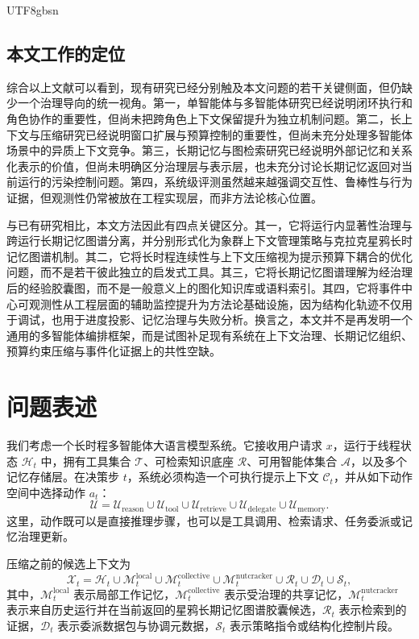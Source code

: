 \documentclass[a4paper,fleqn]{cas-sc}
\begin{document}
\begin{CJK*}{UTF8}{gbsn}
\subsection{本文工作的定位}

综合以上文献可以看到，现有研究已经分别触及本文问题的若干关键侧面，但仍缺少一个治理导向的统一视角。第一，单智能体与多智能体研究已经说明闭环执行和角色协作的重要性，但尚未把跨角色上下文保留提升为独立机制问题。第二，长上下文与压缩研究已经说明窗口扩展与预算控制的重要性，但尚未充分处理多智能体场景中的异质上下文竞争。第三，长期记忆与图检索研究已经说明外部记忆和关系化表示的价值，但尚未明确区分治理层与表示层，也未充分讨论长期记忆返回对当前运行的污染控制问题。第四，系统级评测虽然越来越强调交互性、鲁棒性与行为证据，但观测性仍常被放在工程实现层，而非方法论核心位置。

与已有研究相比，本文方法因此有四点关键区分。其一，它将运行内显著性治理与跨运行长期记忆图谱分离，并分别形式化为象群上下文管理策略与克拉克星鸦长时记忆图谱机制。其二，它将长时程连续性与上下文压缩视为提示预算下耦合的优化问题，而不是若干彼此独立的启发式工具。其三，它将长期记忆图谱理解为经治理后的经验胶囊图，而不是一般意义上的图化知识库或语料索引。其四，它将事件中心可观测性从工程层面的辅助监控提升为方法论基础设施，因为结构化轨迹不仅用于调试，也用于进度投影、记忆治理与失败分析。换言之，本文并不是再发明一个通用的多智能体编排框架，而是试图补足现有系统在上下文治理、长期记忆组织、预算约束压缩与事件化证据上的共性空缺。

\section{问题表述}

我们考虑一个长时程多智能体大语言模型系统。它接收用户请求 $x$，运行于线程状态 $\mathcal{H}_t$ 中，拥有工具集合 $\mathcal{T}$、可检索知识底座 $\mathcal{R}$、可用智能体集合 $\mathcal{A}$，以及多个记忆存储层。在决策步 $t$，系统必须构造一个可执行提示上下文 $\mathcal{C}_t$，并从如下动作空间中选择动作 $a_t$：
\begin{equation}
\mathcal{U} = \mathcal{U}_{\text{reason}} \cup \mathcal{U}_{\text{tool}} \cup \mathcal{U}_{\text{retrieve}} \cup \mathcal{U}_{\text{delegate}} \cup \mathcal{U}_{\text{memory}}.
\end{equation}
这里，动作既可以是直接推理步骤，也可以是工具调用、检索请求、任务委派或记忆治理更新。

压缩之前的候选上下文为
\begin{equation}
\mathcal{X}_t = \mathcal{H}_t \cup \mathcal{M}^{\text{local}}_t \cup \mathcal{M}^{\text{collective}}_t \cup \mathcal{M}^{\text{nutcracker}}_t \cup \mathcal{R}_t \cup \mathcal{D}_t \cup \mathcal{S}_t,
\end{equation}
其中，$\mathcal{M}^{\text{local}}_t$ 表示局部工作记忆，$\mathcal{M}^{\text{collective}}_t$ 表示受治理的共享记忆，$\mathcal{M}^{\text{nutcracker}}_t$ 表示来自历史运行并在当前返回的星鸦长期记忆图谱胶囊候选，$\mathcal{R}_t$ 表示检索到的证据，$\mathcal{D}_t$ 表示委派数据包与协调元数据，$\mathcal{S}_t$ 表示策略指令或结构化控制片段。


\end{CJK*}
\end{document}
